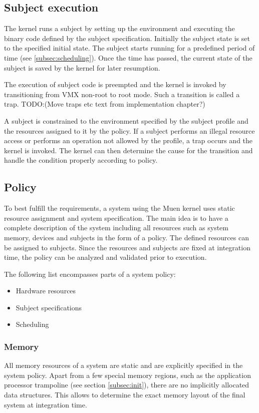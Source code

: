 \subsection{Subject execution}
The kernel runs a subject by setting up the environment and executing the binary
code defined by the subject specification. Initially the subject state is set to
the specified initial state. The subject starts running for a predefined period
of time (see \ref{subsec:scheduling}). Once the time has passed, the current
state of the subject is saved by the kernel for later resumption.

The execution of subject code is preempted and the kernel is invoked by
transitioning from VMX non-root to root mode. Such a transition is called a
trap. TODO:(Move traps etc text from implementation chapter?)

A subject is constrained to the environment specified by the subject profile and
the resources assigned to it by the policy. If a subject performs an illegal
resource access or performs an operation not allowed by the profile, a trap
occurs and the kernel is invoked. The kernel can then determine the cause for
the transition and handle the condition properly according to policy.

\subsection{Policy}
To best fulfill the requirements, a system using the Muen kernel uses static
resource assignment and system specification. The main idea is to have a
complete description of the system including all resources such as system
memory, devices and subjects in the form of a policy. The defined resources can
be assigned to subjects. Since the resources and subjects are fixed at
integration time, the policy can be analyzed and validated prior to execution.

The following list encompasses parts of a system policy:
\begin{itemize}
	\item Hardware resources
	\item Subject specifications
	\item Scheduling
\end{itemize}

\subsubsection{Memory}
All memory resources of a system are static and are explicitly specified in the
system policy. Apart from a few special memory regions, such as the application
processor trampoline (see section \ref{subsec:init}), there are no implicitly
allocated data structures. This allows to determine the exact memory layout of
the final system at integration time.

